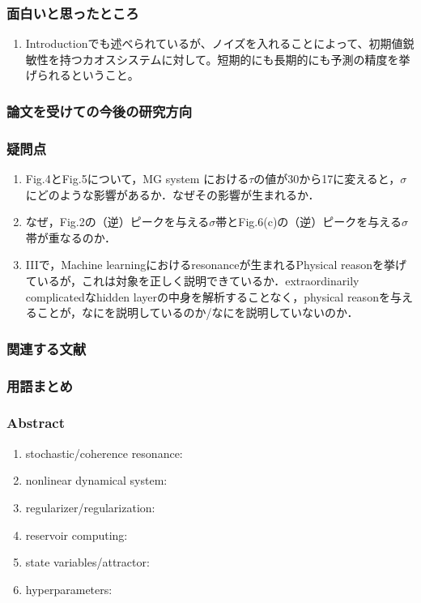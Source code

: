 \subsubsection{面白いと思ったところ}
\begin{enumerate}
  \item Introductionでも述べられているが、ノイズを入れることによって、初期値鋭敏性を持つカオスシステムに対して。短期的にも長期的にも予測の精度を挙げられるということ。
\end{enumerate}

\subsubsection{論文を受けての今後の研究方向}
\subsubsection{疑問点}
\begin{enumerate}
  \item Fig.4とFig.5について，MG system における$\tau$の値が30から17に変えると，$\sigma$にどのような影響があるか．なぜその影響が生まれるか．
  \item なぜ，Fig.2の（逆）ピークを与える$\sigma$帯とFig.6(c)の（逆）ピークを与える$\sigma$帯が重なるのか．
  \item IIIで，Machine learningにおけるresonanceが生まれるPhysical reasonを挙げているが，これは対象を正しく説明できているか．extraordinarily complicatedなhidden layerの中身を解析することなく，physical reasonを与えることが，なにを説明しているのか/なにを説明していないのか．
\end{enumerate}

\subsubsection{関連する文献}
 
\clearpage
\subsubsection{用語まとめ}

\subsubsection{Abstract}
\begin{enumerate}
  \item stochastic/coherence resonance: 
  \item nonlinear dynamical system:
  \item regularizer/regularization:
  \item reservoir computing:
  \item state variables/attractor:
  \item hyperparameters:
\end{enumerate}
